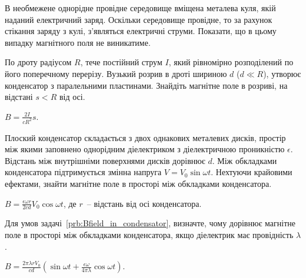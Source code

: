 \begin{problem}
В необмежене однорідне провідне середовище вміщена металева куля, якій наданий електричний заряд. Оскільки середовище провідне, то за рахунок стікання заряду з кулі, з'являться електричні струми. Показати, що в цьому випадку магнітного поля не виникатиме.
\end{problem}


\begin{problem}\label{prb:Griffiths7.34}
По дроту радіусом $R$, тече постійний струм $I$, який рівномірно розподілений по його поперечному перерізу. Вузький розрив в дроті шириною $d$ ($d \ll R$), утворює конденсатор з паралельними пластинами. Знайдіть магнітне поле в розриві, на відстані $s < R$ від осі.
\begin{solution}
	$B = \frac{2I}{cR^2}s$.
\end{solution}
\end{problem}


\begin{problem}\label{prb:Bfield_in_condensator}
Плоский конденсатор складається з двох однакових металевих дисків, простір між якими заповнено однорідним діелектриком з діелектричною проникністю $\epsilon$. Відстань між внутрішніми поверхнями дисків дорівнює $d$. Між обкладками конденсатора підтримується змінна напруга $V = V_0\sin\omega t$. Нехтуючи крайовими ефектами, знайти магнітне поле в просторі між обкладками конденсатора.
\begin{solution}
	$B = \frac{\epsilon\omega r}{2cd}V_0\cos\omega t$, де $r$~-- відстань від осі конденсатора.
\end{solution}
 \end{problem}

\begin{problem}\label{prb:Bfield_in_condensator_with_currnet}
    Для умов задачі~\ref{prb:Bfield_in_condensator}, визначте, чому дорівнює  магнітне поле в просторі між обкладками конденсатора, якщо діелектрик має провідність $\lambda$.
\begin{solution}
	$B = \frac{2\pi\lambda r V_0}{cd}\left( \sin\omega t + \frac{\epsilon \omega}{4\pi\lambda}\cos\omega t\right) $.
\end{solution}
\end{problem}


